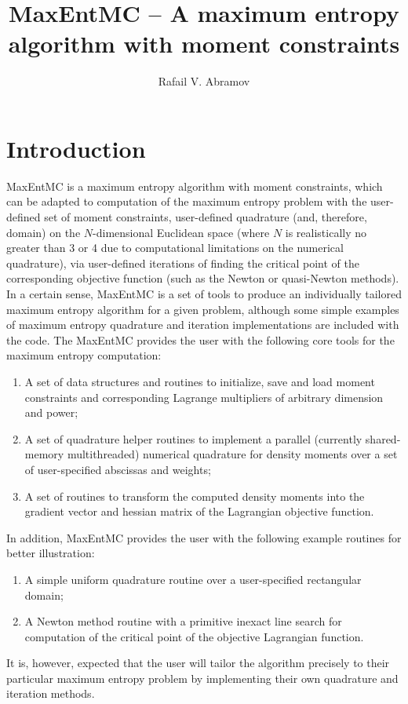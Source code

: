 \documentclass[12pt]{amsart}
\numberwithin{equation}{section}
\begin{document}
\title{MaxEntMC -- A maximum entropy algorithm with moment
constraints}

\author{Rafail V. Abramov}

\maketitle

\tableofcontents

\section{Introduction}

MaxEntMC is a maximum entropy algorithm with moment constraints, which
can be adapted to computation of the maximum entropy problem with the
user-defined set of moment constraints, user-defined quadrature (and,
therefore, domain) on the $N$-dimensional Euclidean space (where $N$
is realistically no greater than 3 or 4 due to computational
limitations on the numerical quadrature), via user-defined iterations
of finding the critical point of the corresponding objective function
(such as the Newton or quasi-Newton methods). In a certain sense,
MaxEntMC is a set of tools to produce an individually tailored maximum
entropy algorithm for a given problem, although some simple examples
of maximum entropy quadrature and iteration implementations are
included with the code. The MaxEntMC provides the user with the
following core tools for the maximum entropy computation:
%
\begin{enumerate}
\item A set of data structures and routines to initialize, save and
  load moment constraints and corresponding Lagrange multipliers of
  arbitrary dimension and power;
\item A set of quadrature helper routines to implement a parallel
  (currently shared-memory multithreaded) numerical quadrature for
  density moments over a set of user-specified abscissas and weights;
\item A set of routines to transform the computed density moments into
  the gradient vector and hessian matrix of the Lagrangian objective
  function.
\end{enumerate}
%
In addition, MaxEntMC provides the user with the following 
example routines for better illustration:
%
\begin{enumerate}
\item A simple uniform quadrature routine over a user-specified
  rectangular domain;
\item A Newton method routine with a primitive inexact line search for
  computation of the critical point of the objective Lagrangian
  function.
\end{enumerate}
%
It is, however, expected that the user will tailor the algorithm
precisely to their particular maximum entropy problem by implementing
their own quadrature and iteration methods.
\end{document}
